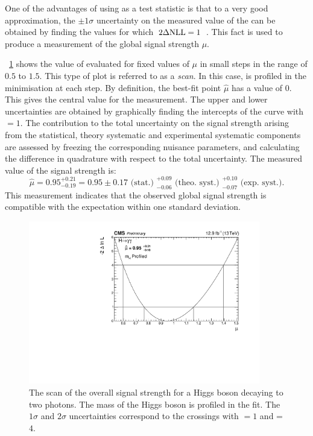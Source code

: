 One of the advantages of using \DNLL as a test statistic is that to a very good approximation, the $\pm 1 \sigma$ uncertainty on the measured value of the \POI can be obtained by finding the values for which $\,2\Delta\text{NLL}=1$~\cite{Cowan}. %
This fact is used to produce a measurement of the global signal strength $\mu$. 

\Fig~\ref{fig:statandresults:global_mu} shows the value of \DNLL evaluated for fixed values of $\mu$ in small steps in the range of $0.5$ to $1.5$. This type of plot is referred to as a \DNLL \emph{scan}. In this case, \mH is profiled in the minimisation at each step. By definition, the best-fit point $\hat{\mu}$ has a \DNLL value of $0$. This gives the central value for the measurement. The upper and lower uncertainties are obtained by graphically finding the intercepts of the curve with \DNLL$=1$. 
The contribution to the total uncertainty on the signal strength arising from the statistical, theory systematic and experimental systematic components are assessed by freezing the corresponding nuisance parameters, and calculating the difference in quadrature with respect to the total uncertainty. 
The measured value of the signal strength is:
\begin{equation*}
\hat{\mu}=0.95 ^{+0.21}_{-0.19} = 0.95 \pm 0.17 \text{ (stat.) }^{+0.09}_{-0.06} \text{ (theo. syst.) }^{+0.10}_{-0.07} \text{ (exp. syst.)}. 
\end{equation*}
This measurement indicates that the observed global signal strength is compatible with the \SM expectation within one standard deviation.

\begin{figure}[ht!]
\centering
\includegraphics[width=0.9\textwidth]{statandresultsFigures/MuScanProfileMH.pdf} 
\caption{The \DNLL scan of the overall signal strength for a Higgs boson decaying to two photons. The mass of the Higgs boson is profiled in the fit. The $1\sigma$ and $2\sigma$ uncertainties correspond to the crossings with \DNLL$=1$ and \DNLL=$4$.}

\label{fig:statandresults:global_mu}
\end{figure}

